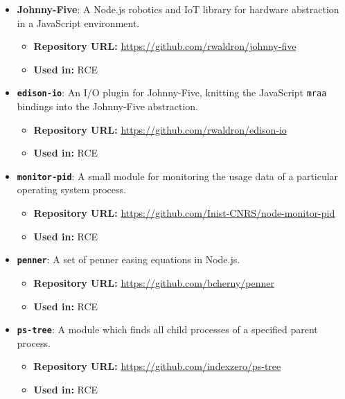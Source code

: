 \begin{itemize}
      \item \textbf{Johnny-Five}: A Node.js robotics and IoT library for hardware abstraction in a JavaScript environment.
        \begin{itemize}
          \item \textbf{Repository URL:} \url{https://github.com/rwaldron/johnny-five}
          \item \textbf{Used in:} RCE
        \end{itemize}
        
      \item \textbf{\texttt{edison-io}}: An I/O plugin for Johnny-Five, knitting the JavaScript \texttt{mraa} bindings into the Johnny-Five abstraction.
        \begin{itemize}
          \item \textbf{Repository URL:} \url{https://github.com/rwaldron/edison-io}
          \item \textbf{Used in:} RCE
        \end{itemize}
        
      \item \textbf{\texttt{monitor-pid}}: A small module for monitoring the usage data of a particular operating system process.
        \begin{itemize}
          \item \textbf{Repository URL:} \url{https://github.com/Inist-CNRS/node-monitor-pid}
          \item \textbf{Used in:} RCE
        \end{itemize}
        
      \item \textbf{\texttt{penner}}: A set of penner easing equations in Node.js.
        \begin{itemize}
          \item \textbf{Repository URL:} \url{https://github.com/bcherny/penner}
          \item \textbf{Used in:} RCE
        \end{itemize}
        
      \item \textbf{\texttt{ps-tree}}: A module which finds all child processes of a specified parent process.
        \begin{itemize}
          \item \textbf{Repository URL:} \url{https://github.com/indexzero/ps-tree}
          \item \textbf{Used in:} RCE
        \end{itemize}
    \end{itemize}